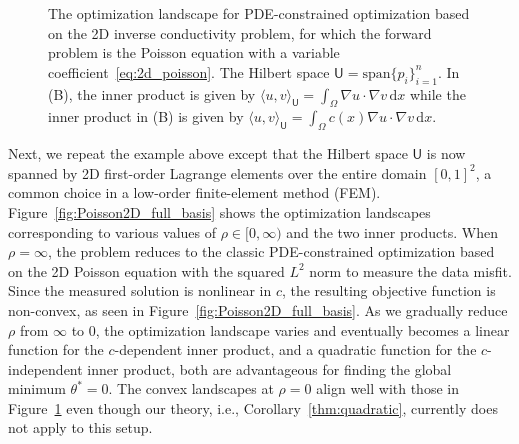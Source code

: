 \documentclass[12pt]{amsart}
\begin{document}
\begin{figure}[ht!]
    \centering
    \caption{The optimization landscape for PDE-constrained optimization based on the 2D inverse conductivity problem, for which the forward problem is the Poisson equation with a variable coefficient~\eqref{eq:2d_poisson}. The Hilbert space $\mathsf{U} = \text{span}\{p_i\}_{i=1}^n$. In (B), the inner product is given by $\langle u, v\rangle_{\mathsf{U}} = \int_\Omega \nabla u \cdot \nabla v  \,  \mathrm{d}x$ while the inner product in (B) is given by  $\langle u, v\rangle_{\mathsf{U}} = \int_\Omega c(x) \nabla u \cdot \nabla v  \,  \mathrm{d}x$.}\label{fig:Poisson2D_source_basis}
\end{figure}

Next, we repeat the example above except that the Hilbert space $\mathsf{U}$ is now  spanned by 2D first-order Lagrange elements over the entire domain $[0,1]^2$, a common choice in a low-order  finite-element method (FEM). Figure~\ref{fig:Poisson2D_full_basis} shows the optimization landscapes corresponding to various values of $\rho \in [0,\infty)$ and the two inner products. When $\rho =\infty$, the problem reduces to the classic PDE-constrained optimization based on the 2D Poisson equation with the squared $L^2$ norm to measure the data misfit. Since the measured solution is nonlinear in $c$, the resulting objective function is non-convex, as seen in Figure~\ref{fig:Poisson2D_full_basis}. As we gradually reduce $\rho$ from $\infty$ to $0$, the optimization landscape varies and eventually becomes a linear function for the $c$-dependent inner product, and a quadratic function for the $c$-independent inner product, both are advantageous for finding the global minimum $\theta^* = 0$. The  convex landscapes at $\rho = 0$ align well with those in Figure~\ref{fig:Poisson2D_source_basis} even though our theory, i.e., Corollary~\ref{thm:quadratic}, currently does not apply to this setup.
\end{document}
